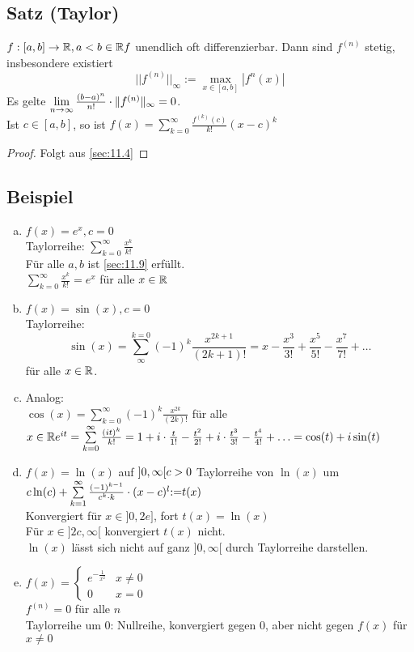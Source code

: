 \subsection{Satz (Taylor)}\label{sec:\thesubsection}
$f: [a,b] \to \mathbb{R}, a < b  \in \mathbb{R}\\
f$ unendlich oft differenzierbar. Dann sind $f^{(n)}$ stetig, insbesondere existiert
\[ ||f^{(n)}||_\infty {:=} \max_{x \in [a,b]} |f^{n}(x)| \]
Es gelte $\lim\limits_{n \to \infty} \frac{(b-a)^n}{n!}\cdot \Vert f^{(n)}\Vert_\infty = 0$.\\
Ist $c \in [a,b]$, so ist  $f(x) = \sum\limits_{k=0}^{\infty} \frac{f^{(k)}(c)}{k!}(x-c)^k$
\begin{proof}
Folgt aus \ref{sec:11.4}
\end{proof}
\subsection{Beispiel}\label{sec:\thesubsection}
\begin{enumerate}[a)]
\item $f(x) = e^x, c= 0$\\
Taylorreihe: $\sum\limits^{\infty}_{k=0} \frac{x^k}{k!}$\\
Für alle $a,b$ ist \ref{sec:11.9} erfüllt.\\
$\sum\limits^{\infty}_{k=0} \frac{x^k}{k!} = e^x$ für alle $x \in \mathbb{R}$
\item $f(x) = \sin(x), c = 0$\\
Taylorreihe:\\
\[\sin(x) = \sum\limits_{\infty}^{k=0} (-1)^k \frac{x^{2k+1}}{(2k+1)!} = x - \frac{x^3}{3!} + \frac{x^5}{5!} - \frac{x^7}{7!} + \ldots \] für alle $x \in \mathbb{R}$.
\item Analog:\\
$\cos(x) = \sum\limits^{\infty}_{k=0} (-1)^k \frac{x^{2k}}{(2k)!}$ für alle $x \in \mathbb{R}\\
e^{it} = \sum\limits^{\infty}_{k=0} \frac{(it)^k}{k!} = 1 + i \cdot \frac{t}{1!} - \frac{t^2}{2!} + i \cdot \frac{t^3}{3!} - \frac{t^4}{4!} + \ldots = \cos(t) + i \sin(t)$
\item $f(x) = \ln(x)$ auf $]0,\infty[\\
c > 0$ Taylorreihe von $\ln(x)$ um $c\\
\ln(c) + \sum\limits^{\infty}_{k=1} \frac{(-1)^{k-1}}{c^k \cdot k} \cdot (x-c)^l {:=} t(x)$\\
Konvergiert für $x \in ]0,2e]$, fort $t(x) = \ln(x)$\\
Für $x \in ]2c,\infty[$ konvergiert $t(x)$ nicht.\\
$\ln(x)$ lässt sich nicht auf ganz $]0,\infty[$ durch Taylorreihe darstellen.\\
\item $f(x) = \begin{cases}
e^{-\frac1 {x^2}}& x \ne 0\\
0 & x = 0
\end{cases}$\\
$f^{(n)} = 0 $ für alle $n$\\
Taylorreihe um $0$: Nullreihe, konvergiert gegen 0, aber nicht gegen $f(x)$ für $x \ne 0$
\end{enumerate}
